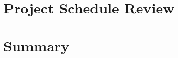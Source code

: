 \documentclass[11pt,a4paper]{article}
\begin{document}
\section{Project Schedule Review}

\section{Summary}

\newpage


\end{document}
